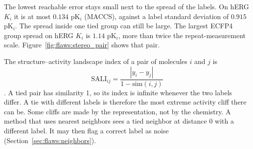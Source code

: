 The lowest reachable error stays small next to the spread of the labels. On hERG $K_i$ it is at most $0.134$ pK$_i$ (MACCS), against a label standard deviation of $0.915$ pK$_i$. The spread inside one tied group can still be large. The largest ECFP4 group spread on hERG $K_i$ is $1.14$ pK$_i$, more than twice the repeat-measurement scale. Figure~\ref{fig:flaws:stereo_pair} shows that pair.

The structure--activity landscape index of a pair of molecules $i$ and $j$ is
\begin{equation}
\mathrm{SALI}_{ij} = \frac{|y_i - y_j|}{1 - \mathrm{sim}(i,j)}
\end{equation}
\citep{Guha2008}. A tied pair has similarity 1, so its index is infinite whenever the two labels differ. A tie with different labels is therefore the most extreme activity cliff there can be. Some cliffs are made by the representation, not by the chemistry. A method that uses nearest neighbors sees a tied neighbor at distance 0 with a different label. %
It may then flag a correct label as noise (Section~\ref{sec:flaws:neighbors}).

